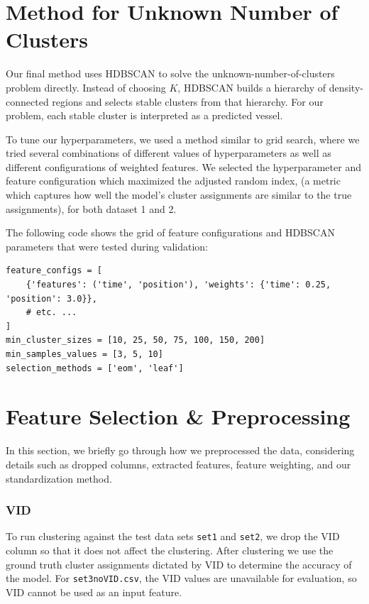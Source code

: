\documentclass[12pt]{fphw}
\begin{document}
\section*{Method for Unknown Number of Clusters}
Our final method uses HDBSCAN to solve the unknown-number-of-clusters problem directly. Instead of choosing $K$, HDBSCAN builds a hierarchy of density-connected regions and selects stable clusters from that hierarchy. For our problem, each stable cluster is interpreted as a predicted vessel.

To tune our hyperparameters, we used a method similar to grid search, where we tried several combinations of different values of hyperparameters as well as different configurations of weighted features. We selected the hyperparameter and feature configuration which maximized the adjusted random index, 
(a metric which captures how well the model's cluster assignments are similar to the true assignments), for both dataset 1 and 2.

The following code shows the grid of feature configurations and HDBSCAN parameters that were tested during validation:

\begin{lstlisting}
feature_configs = [
    {'features': ('time', 'position'), 'weights': {'time': 0.25, 'position': 3.0}},
    # etc. ...
]
min_cluster_sizes = [10, 25, 50, 75, 100, 150, 200]
min_samples_values = [3, 5, 10]
selection_methods = ['eom', 'leaf']
\end{lstlisting}

\section*{Feature Selection \& Preprocessing}

In this section, we briefly go through how we preprocessed the data, considering details such as dropped columns, extracted features, feature weighting, and our standardization method.

\subsubsection*{VID} To run clustering against the test data sets \texttt{set1} and \texttt{set2}, we drop the VID column so that it does not affect the clustering. After clustering we use the ground truth cluster assignments dictated by VID to determine the accuracy of the model. For \texttt{set3noVID.csv}, the VID values are unavailable for evaluation, so VID cannot be used as an input feature.
\end{document}
